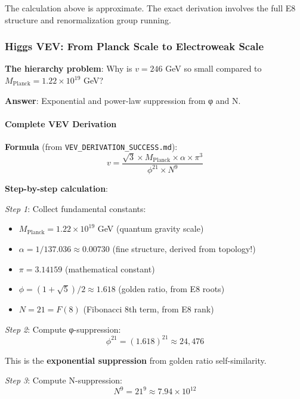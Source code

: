 \documentclass[12pt,a4paper]{article}
\begin{document}
The calculation above is approximate. The exact derivation involves the full E8 structure and renormalization group running.

\subsubsection{Higgs VEV: From Planck Scale to Electroweak Scale}

\textbf{The hierarchy problem}: Why is $v = 246$ GeV so small compared to $M_{\text{Planck}} = 1.22 \times 10^{19}$ GeV?

\textbf{Answer}: Exponential and power-law suppression from φ and N.

\paragraph{Complete VEV Derivation}

\textbf{Formula} (from \texttt{VEV\_DERIVATION\_SUCCESS.md}):
\begin{equation}
v = \frac{\sqrt{3} \times M_{\text{Planck}} \times \alpha \times \pi^3}{\phi^{21} \times N^9}
\end{equation}

\textbf{Step-by-step calculation}:

\textit{Step 1}: Collect fundamental constants:
\begin{itemize}
\item $M_{\text{Planck}} = 1.22 \times 10^{19}$ GeV (quantum gravity scale)
\item $\alpha = 1/137.036 \approx 0.00730$ (fine structure, derived from topology!)
\item $\pi = 3.14159$ (mathematical constant)
\item $\phi = (1+\sqrt{5})/2 \approx 1.618$ (golden ratio, from E8 roots)
\item $N = 21 = F(8)$ (Fibonacci 8th term, from E8 rank)
\end{itemize}

\textit{Step 2}: Compute φ-suppression:
\begin{equation}
\phi^{21} = (1.618)^{21} \approx 24,476
\end{equation}

This is the \textbf{exponential suppression} from golden ratio self-similarity.

\textit{Step 3}: Compute N-suppression:
\begin{equation}
N^9 = 21^9 \approx 7.94 \times 10^{12}
\end{equation}
\end{document}

